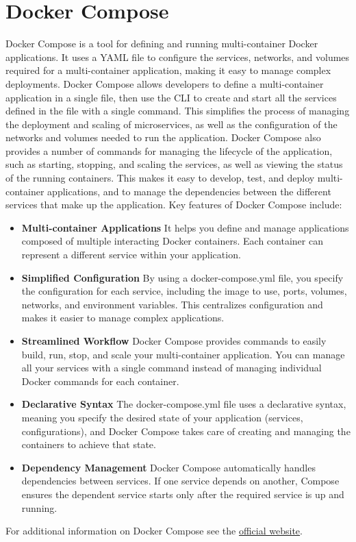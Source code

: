\section {Docker Compose}
Docker Compose is a tool for defining and running multi-container Docker applications. It uses a YAML file to configure the services, networks, and volumes required for a multi-container application, making it easy to manage complex deployments. Docker Compose allows developers to define a multi-container application in a single file, then use the \ac{CLI} to create and start all the services defined in the file with a single command. This simplifies the process of managing the deployment and scaling of microservices, as well as the configuration of the networks and volumes needed to run the application. Docker Compose also provides a number of commands for managing the lifecycle of the application, such as starting, stopping, and scaling the services, as well as viewing the status of the running containers. This makes it easy to develop, test, and deploy multi-container applications, and to manage the dependencies between the different services that make up the application.
Key features of Docker Compose include:
\begin{itemize}
    \item \textbf{Multi-container Applications} It helps you define and manage applications composed of multiple interacting Docker containers. Each container can represent a different service within your application. 
    \item \textbf{Simplified Configuration} By using a docker-compose.yml file, you specify the configuration for each service, including the image to use, ports, volumes, networks, and environment variables. This centralizes configuration and makes it easier to manage complex applications. 
    \item \textbf{Streamlined Workflow} Docker Compose provides commands to easily build, run, stop, and scale your multi-container application. You can manage all your services with a single command instead of managing individual Docker commands for each container. 
    \item \textbf{Declarative Syntax} The docker-compose.yml file uses a declarative syntax, meaning you specify the desired state of your application (services, configurations), and Docker Compose takes care of creating and managing the containers to achieve that state. 
    \item \textbf{Dependency Management} Docker Compose automatically handles dependencies between services. If one service depends on another, Compose ensures the dependent service starts only after the required service is up and running. 
\end{itemize}
    For additional information on Docker Compose see the \href{https://docs.docker.com/compose/}{official website}.
